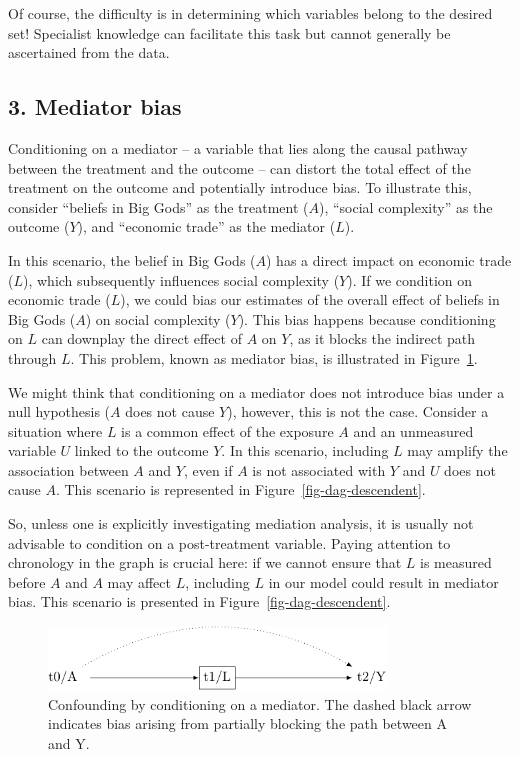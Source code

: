 \documentclass[
  singlecolumn]{report}
\begin{document}
Of course, the difficulty is in determining which variables belong to
the desired set! Specialist knowledge can facilitate this task but
cannot generally be ascertained from the data.

\hypertarget{mediator-bias}{%
\subsection{3. Mediator bias}\label{mediator-bias}}

Conditioning on a mediator -- a variable that lies along the causal
pathway between the treatment and the outcome -- can distort the total
effect of the treatment on the outcome and potentially introduce bias.
To illustrate this, consider ``beliefs in Big Gods'' as the treatment
(\(A\)), ``social complexity'' as the outcome (\(Y\)), and ``economic
trade'' as the mediator (\(L\)).

In this scenario, the belief in Big Gods (\(A\)) has a direct impact on
economic trade (\(L\)), which subsequently influences social complexity
(\(Y\)). If we condition on economic trade (\(L\)), we could bias our
estimates of the overall effect of beliefs in Big Gods (\(A\)) on social
complexity (\(Y\)). This bias happens because conditioning on \(L\) can
downplay the direct effect of \(A\) on \(Y\), as it blocks the indirect
path through \(L\). This problem, known as mediator bias, is illustrated
in Figure~\ref{fig-dag-mediator}.

We might think that conditioning on a mediator does not introduce bias
under a null hypothesis (\(A\) does not cause \(Y\)), however, this is
not the case. Consider a situation where \(L\) is a common effect of the
exposure \(A\) and an unmeasured variable \(U\) linked to the outcome
\(Y\). In this scenario, including \(L\) may amplify the association
between \(A\) and \(Y\), even if \(A\) is not associated with \(Y\) and
\(U\) does not cause \(A\). This scenario is represented in
Figure~\ref{fig-dag-descendent}.

So, unless one is explicitly investigating mediation analysis, it is
usually not advisable to condition on a post-treatment variable. Paying
attention to chronology in the graph is crucial here: if we cannot
ensure that \(L\) is measured before \(A\) and \(A\) may affect \(L\),
including \(L\) in our model could result in mediator bias. This
scenario is presented in Figure~\ref{fig-dag-descendent}.

\begin{figure}

{\centering \includegraphics[width=0.8\textwidth,height=\textheight]{causal-dags_files/figure-pdf/fig-dag-mediator-1.pdf}

}

\caption{\label{fig-dag-mediator}Confounding by conditioning on a
mediator. The dashed black arrow indicates bias arising from partially
blocking the path between A and Y.}

\end{figure}
\end{document}
